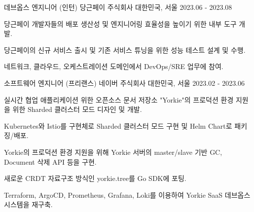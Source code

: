 

\begin{cventries}

  \cventry
    {데브옵스 엔지니어 (인턴)} %
    {당근페이 주식회사} %
    {대한민국, 서울} %
    {2023.06 - 2023.08} %
    {
      \begin{cvitems} %
        \item {당근페이 개발자들의 배포 생산성 및 엔지니어링 효율성을 높이기 위한 내부 도구 개발.}
        \item {당근페이의 신규 서비스 출시 및 기존 서비스 튜닝을 위한 성능 테스트 설계 및 수행.}
        \item {네트워크, 클라우드, 오케스트레이션 도메인에서 DevOps/SRE 업무에 참여.}
      \end{cvitems}
    }

  \cventry
    {소프트웨어 엔지니어 (프리랜스)} %
    {네이버 주식회사} %
    {대한민국, 서울} %
    {2023.02 - 2023.06} %
    {
      \begin{cvitems} %
        \item {실시간 협업 애플리케이션 위한 오픈소스 문서 저장소 "Yorkie"의 프로덕션 환경 지원을 위한 Sharded 클러스터 모드 디자인 및 개발.}
        \item {Kubernetes와 Istio를 구현체로 Sharded 클러스터 모드 구현 및 Helm Chart로 패키징/배포.}
        \item {Yorkie의 프로덕션 환경 지원을 위해 Yorkie 서버의 master/slave 기반 GC, Document 삭제 API 등을 구현.}      
        \item {새로운 CRDT 자료구조 방식인 yorkie.tree를 Go SDK에 포팅.}  
        \item {Terraform, ArgoCD, Prometheus, Grafana, Loki를 이용하여 Yorkie SaaS 데브옵스 시스템을 재구축.}
      \end{cvitems}
    }


\end{cventries}
